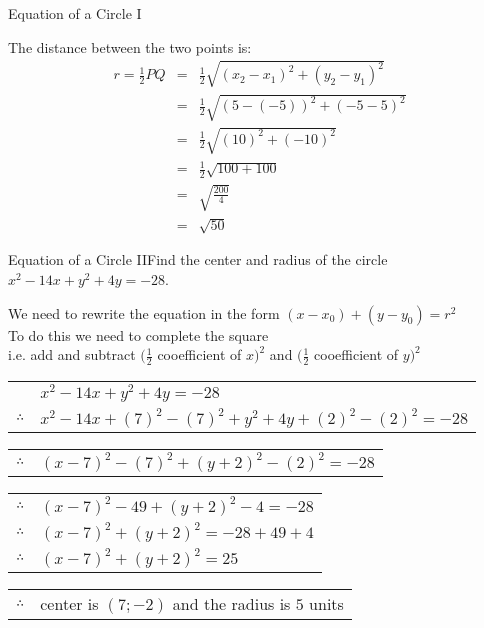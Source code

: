 \begin{wex}{Equation of a Circle I}
{The distance between the two points is:
\begin{eqnarray*}
r=\frac{1}{2}PQ &=& \frac{1}{2}\sqrt{(x_2-x_1)^2+(y_2-y_1)^2}\\
&=& \frac{1}{2}\sqrt{(5-(-5))^2+(-5-5)^2}\\
&=& \frac{1}{2}\sqrt{(10)^2+(-10)^2}\\
&=& \frac{1}{2}\sqrt{100+100}\\
&=& \sqrt{\frac{200}{4}}\\
&=& \sqrt{50}
\end{eqnarray*}

}
\end{wex}

\begin{wex}{Equation of a Circle II}{Find the center and radius of the circle \\ $x^2 - 14 x + y^2 + 4y = -28$.}{
We need to rewrite the equation in the form  $(x - x_0) + (y - y_0) = r^2$ \\
To do this we need to complete the square \\
i.e. add and subtract $(\frac{1}{2}$ cooefficient of $x)^2$ and $(\frac{1}{2}$ cooefficient of $y)^2$ \\

\begin{tabular}{ll}
& $x^2 - 14 x + y^2 + 4y = -28$ \\
$\therefore$ & $x^2 - 14 x + (7)^2 -(7)^2 + y^2 + 4y + (2)^2 -(2)^2 = -28$ \\
\end{tabular}

\begin{tabular}{ll}
$\therefore$ & $(x - 7)^2 -(7)^2 + (y + 2)^2 -(2)^2 = -28$ \\
\end{tabular}

\begin{tabular}{ll}
$\therefore$ & $(x - 7)^2 -49 + (y + 2)^2 -4 = -28$ \\
$\therefore$ & $(x - 7)^2 + (y + 2)^2 = -28 + 49 + 4$ \\ 
$\therefore$ & $(x - 7)^2 + (y + 2)^2 = 25$ \\
\end{tabular}

\begin{tabular}{ll}
$\therefore$ & center is $ (7;-2)$ and the radius is $5$ units
\end{tabular}
}
\end{wex}

